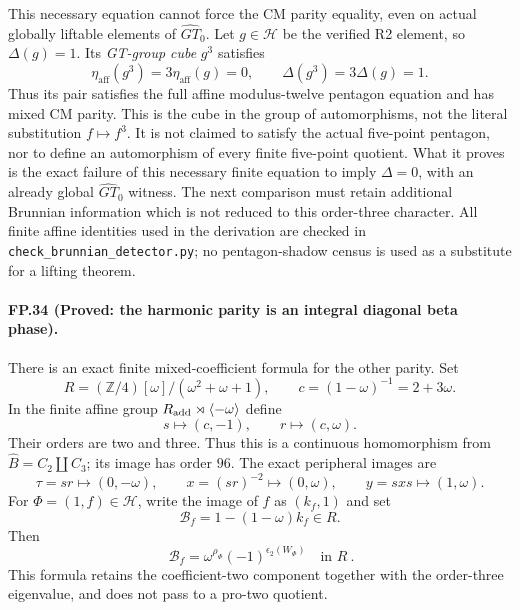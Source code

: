 This necessary equation cannot force the CM parity equality, even on
actual globally liftable elements of $\widehat{GT}_0$.
Let $g\in\mathcal H$ be the verified R2 element, so
$\Delta(g)=1$. Its \emph{GT-group cube} $g^3$ satisfies
\[
 \eta_{\mathrm{aff}}(g^3)=3\eta_{\mathrm{aff}}(g)=0,
 \qquad \Delta(g^3)=3\Delta(g)=1.
 \tag{FP.33.5}
\]
Thus its pair satisfies the full affine modulus-twelve pentagon
equation and has mixed CM parity. This is the cube in the group of
automorphisms, not the literal substitution $f\mapsto f^3$.
It is not claimed to satisfy the actual five-point pentagon, nor to
define an automorphism of every finite five-point quotient. What it
proves is the exact failure of this necessary finite equation to
imply $\Delta=0$, with an already global $\widehat{GT}_0$ witness.
The next comparison must retain additional Brunnian information
which is not reduced to this order-three character.
All finite affine identities used in the derivation are checked in
\texttt{check\_brunnian\_detector.py}; no pentagon-shadow census is
used as a substitute for a lifting theorem.

\paragraph{FP.34 (Proved: the harmonic parity is an integral diagonal beta phase).}
There is an exact finite mixed-coefficient formula for the other
parity. Set
\[
 R=(\mathbb Z/4)[\omega]/(\omega^2+\omega+1),\qquad
 c=(1-\omega)^{-1}=2+3\omega.
\]
In the finite affine group $R_{\rm add}\rtimes\langle-\omega\rangle$
define
\[
 s\longmapsto(c,-1),\qquad r\longmapsto(c,\omega).
 \tag{FP.34.1}
\]
Their orders are two and three. Thus this is a continuous
homomorphism from $\widehat B=C_2\amalg C_3$; its image has order
$96$. The exact peripheral images are
\[
 \tau=sr\longmapsto(0,-\omega),\qquad
 x=(sr)^{-2}\longmapsto(0,\omega),\qquad
 y=sxs\longmapsto(1,\omega).
\]
For $\Phi=(1,f)\in\mathcal H$, write the image of $f$ as
$(k_f,1)$ and set
\[
 \mathcal B_f=1-(1-\omega)k_f\in R.
\]
Then
\[
 \boxed{\ \mathcal B_f
       =\omega^{\rho_\Phi}(-1)^{\epsilon_2(W_\Phi)}\quad\text{in }R\ }.
 \tag{FP.34.2}
\]
This formula retains the coefficient-two component together with
the order-three eigenvalue, and does not pass to a pro-two quotient.

